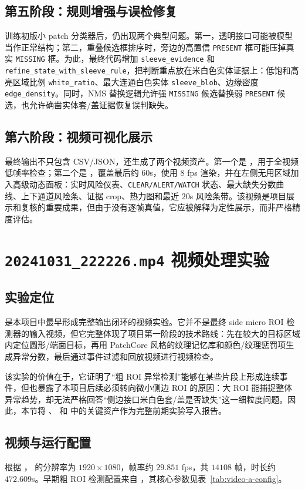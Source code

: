 \documentclass[a4paper,12pt]{article}
\newcommand{\code}[1]{\texttt{#1}}
\begin{document}
\subsection{第五阶段：规则增强与误检修复}
训练初版小 patch 分类器后，仍出现两个典型问题。第一，透明接口可能被模型当作正常结构；第二，重叠候选框排序时，旁边的高置信 \code{PRESENT} 框可能压掉真实 \code{MISSING} 框。为此，最终代码增加 \code{sleeve\_evidence} 和 \code{refine\_state\_with\_sleeve\_rule}，把判断重点放在米白色实体证据上：低饱和高亮区域比例 \code{white\_ratio}、最大连通白色实体 \code{sleeve\_blob}、边缘密度 \code{edge\_density}。同时，NMS 替换逻辑允许强 \code{MISSING} 候选替换弱 \code{PRESENT} 候选，也允许确凿实体套/盖证据恢复误判缺失。

\subsection{第六阶段：视频可视化展示}
最终输出不只包含 CSV/JSON，还生成了两个视频资产。第一个是 ，用于全视频低帧率检查；第二个是 ，覆盖最后约 $60$s，使用 $8$ fps 渲染，并在左侧无用区域加入高级动态面板：实时风险仪表、\code{CLEAR/ALERT/WATCH} 状态、最大缺失分数曲线、上下通道风险条、证据 crop、热力图和最近 $20$s 风险条带。该视频是项目展示和复核的重要成果，但由于没有逐帧真值，它应被解释为定性展示，而非严格精度评估。
\newpage
\section{\code{20241031\_222226.mp4} 视频处理实验}
\subsection{实验定位}
 是本项目中最早形成完整输出闭环的视频实验。它并不是最终 side micro ROI 检测器的输入视频，但它完整体现了项目第一阶段的技术路线：先在较大的目标区域内定位圆形/端面目标，再用 PatchCore 风格的纹理记忆库和颜色/纹理惩罚项生成异常分数，最后通过事件过滤和回放视频进行视频检查。

该实验的价值在于，它证明了“粗 ROI 异常检测”能够在某些片段上形成连续事件，但也暴露了本项目后续必须转向微小侧边 ROI 的原因：大 ROI 能捕捉整体异常趋势，却无法严格回答“侧边接口米白色套/盖是否缺失”这一细粒度问题。因此，本节将 、 和  中的关键资产作为完整前期实验写入报告。

\subsection{视频与运行配置}
根据 ， 的分辨率为 $1920\times1080$，帧率约 $29.851$ fps，共 $14108$ 帧，时长约 $472.609$s。早期粗 ROI 检测配置来自 ，其核心参数见表~\ref{tab:video-a-config}。
\end{document}

